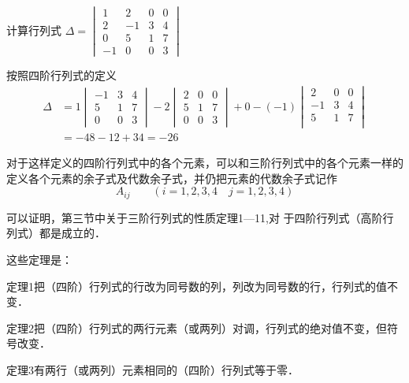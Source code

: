 \begin{example}
    计算行列式 $\Delta =\begin{vmatrix}
        1&2&0&0\\
        2&-1&3&4\\
        0&5&1&7\\
        -1&0&0&3
    \end{vmatrix}$
\end{example}


\begin{solution}
按照四阶行列式的定义
\[\begin{split}
\Delta&=1\begin{vmatrix}
    -1&3&4\\
    5&1&7\\
    0&0&3
\end{vmatrix}-2\begin{vmatrix}
    2&0&0\\ 5&1&7\\
    0&0&3
\end{vmatrix}+0-(-1)\begin{vmatrix}
    2&0&0\\-1&3&4\\5&1&7\\
\end{vmatrix}\\
&=-48-12+34=-26
\end{split}\]
\end{solution}

对于这样定义的四阶行列式中的各个元素，可以和三阶行列式中的各个元素一样的定义各个元素的余子式及代数余子式，并仍把元素的代数余子式记作
\[A_{ij}\qquad  (i=1,2,3,4\quad  j=1,2,3,4)\]

可以证明，第三节中关于三阶行列式的性质定理1—11,对
于四阶行列式（高阶行列式）都是成立的．

这些定理是：

\begin{blk}
    {定理1}把（四阶）行列式的行改为同号数的列，列改为同号数的行，行列式的值不变．
\end{blk}

\begin{blk}
    {定理2}把（四阶）行列式的两行元素（或两列）对调，行列式的绝对值不变，但符号改变．
\end{blk}

\begin{blk}
    {定理3}有两行（或两列）元素相同的（四阶）行列式等于零．
\end{blk}

